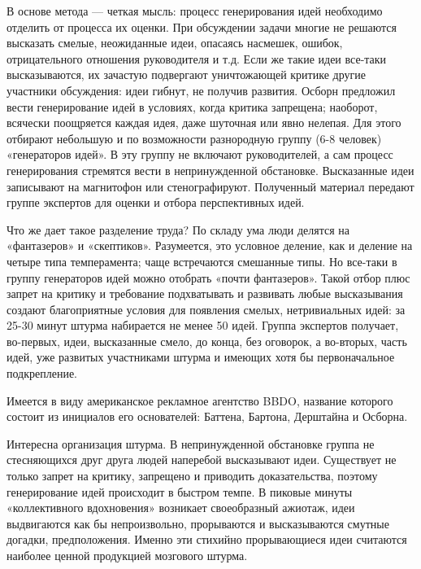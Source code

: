 В основе метода — четкая  мысль: процесс генерирования идей необходимо
отделить  от  процесса их  оценки.  При  обсуждении задачи  многие  не
решаются  высказать  смелые,   неожиданные  идеи,  опасаясь  насмешек,
ошибок,  отрицательного отношения  руководителя и  т.д. Если  же такие
идеи  все-таки  высказываются,  их  зачастую  подвергают  уничтожающей
критике другие участники обсуждения: идеи гибнут, не получив развития.
Осборн предложил  вести генерирование  идей в условиях,  когда критика
запрещена; наоборот,  всячески поощряется  каждая идея,  даже шуточная
или  явно  нелепая. Для  этого  отбирают  небольшую и  по  возможности
разнородную группу (6-8  человек) «генераторов идей». В  эту группу не
включают руководителей, а сам  процесс генерирования стремятся вести в
непринужденной обстановке.  Высказанные идеи записывают  на магнитофон
или стенографируют. Полученный материал  передают группе экспертов для
оценки и отбора перспективных идей.

Что же  дает такое  разделение труда?  По складу  ума люди  делятся на
«фантазеров» и  «скептиков». Разумеется,  это условное деление,  как и
деление  на  четыре  типа  темперамента;  чаще  встречаются  смешанные
типы.  Но все-таки  в группу  генераторов идей  можно отобрать  «почти
фантазеров».  Такой   отбор  плюс  запрет  на   критику  и  требование
подхватывать  и  развивать  любые высказывания  создают  благоприятные
условия  для  появления смелых,  нетривиальных  идей:  за 25-30  минут
штурма  набирается  не  менее  50  идей.  Группа  экспертов  получает,
во-первых,  идеи,  высказанные  смело,   до  конца,  без  оговорок,  а
во-вторых, часть идей, уже развитых  участниками штурма и имеющих хотя
бы первоначальное подкрепление.

Имеется  в  виду  американское   рекламное  агентство  BBDO,  название
которого  состоит  из  инициалов его  основателей:  Баттена,  Бартона,
Дерштайна и Осборна.


Интересна организация  штурма. В  непринужденной обстановке  группа не
стесняющихся друг  друга людей наперебой высказывают  идеи. Существует
не  только запрет  на критику,  запрещено и  приводить доказательства,
поэтому  генерирование  идей происходит  в  быстром  темпе. В  пиковые
минуты  «коллективного  вдохновения» возникает  своеобразный  ажиотаж,
идеи  выдвигаются как  бы непроизвольно,  прорываются и  высказываются
смутные догадки, предположения. Именно эти стихийно прорывающиеся идеи
считаются наиболее ценной продукцией мозгового штурма.

